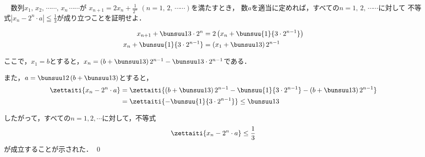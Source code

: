 \begin{problem}
  　数列$x_1, \, x_2, \, \cdots\cdots, \, x_n \, \cdots\cdots$が
$\displaystyle x_{n+1}=2x_n+\frac{1}{2^n}$ $(n=1, \, 2, \, \cdots\cdots)$を満たすとき，
数$a$を適当に定めれば，すべての$n=1, \, 2, \, \cdots\cdots$に対して
不等式$\displaystyle|x_n-2^n \cdot a|\leqq\frac{1}{3}$が成り立つことを証明せよ．
\end{problem}


\begin{align*}
  x_{n+1} + \bunsuu1{3\cdot 2^n} &= 2\left(x_n + \bunsuu{1}{3 \cdot 2^{n-1}}\right) \\
  x_n + \bunsuu{1}{3\cdot 2^{n-1}} &= \left(x_1 + \bunsuu13\right) 2^{n-1}
\end{align*}

ここで，$x_1 = b$とすると，$x_n = \left(b + \bunsuu13\right) 2^{n-1} - \bunsuu1{3\cdot 2^{n-1}}$である．

また，$a = \bunsuu12 \left(b + \bunsuu13\right)$とすると，
\begin{align*}
  \zettaiti{x_n - 2^n \cdot a} &=
  \zettaiti{\left(b + \bunsuu13\right) 2^{n-1} - \bunsuu{1}{3\cdot 2^{n-1}} - \left(b + \bunsuu13\right) 2^{n-1}} \\
  &=\zettaiti{- \bunsuu{1}{3\cdot 2^{n-1}}} \leq \bunsuu13
\end{align*}

したがって，すべての$n = 1,2,\cdots$に対して，不等式
\[\zettaiti{x_n - 2^n \cdot a} \leq \frac13 \]
が成立することが示された．
\qed
